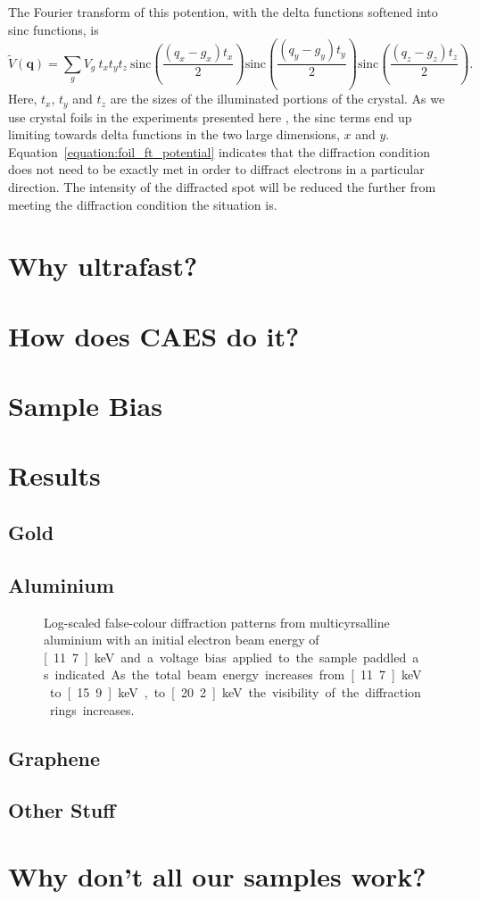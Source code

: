 The Fourier transform of this potention, with the delta functions softened into sinc functions, is
\begin{equation}\label{equation:foil_ft_potential}
\tilde{V}(\mathbf{q}) = \sum_g V_g \: t_x  t_y  t_z \: \text{sinc}{\left( \frac{(q_x-g_x)t_x}{2} \right)} \text{sinc}{\left( \frac{(q_y-g_y)t_y}{2} \right)} \text{sinc}{\left( \frac{(q_z-g_z)t_z}{2} \right)}.
\end{equation}
Here, $t_x$, $t_y$ and $t_z$ are the sizes of the illuminated portions of the crystal.
As we use crystal foils in the experiments presented here , the sinc terms end up limiting towards delta functions in the two large dimensions, $x$ and $y$.
Equation~\ref{equation:foil_ft_potential} indicates that the diffraction condition does not need to be exactly met in order to diffract electrons in a particular direction.
The intensity of the diffracted spot will be reduced the further from meeting the diffraction condition the situation is.

\section{Why ultrafast?}

\section{How does CAES do it?}

\section{Sample Bias}\label{section:sample_bias}

\section{Results}

\subsection{Gold}

\subsection{Aluminium}

\begin{figure}
    \center
    
    \caption{Log-scaled false-colour diffraction patterns from multicyrsalline aluminium with an initial electron beam energy of \unit[11.7]{keV} and a voltage bias applied to the sample paddled as indicated. As the total beam energy increases from \unit[11.7]{keV} to \unit[15.9]{keV}, to \unit[20.2]{keV} the visibility of the diffraction rings increases.}
    \label{figure:al_diffraction}
\end{figure}

\subsection{Graphene}

\subsection{Other Stuff}

\section{Why don't all our samples work?}